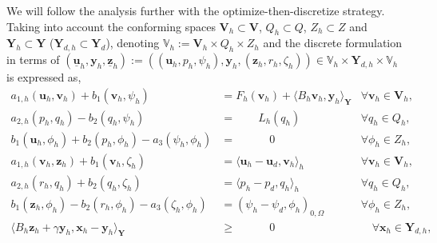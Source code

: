 \documentclass[smallextended]{svjour3}
\numberwithin{equation}{section}
\numberwithin{figure}{section}
\numberwithin{table}{section}
\newcommand\bV{\mathbf{V}}
\newcommand\buu{\underline{\boldsymbol{u}}}
\newcommand\buz{\underline{\boldsymbol{z}}}
\newcommand\bx{\boldsymbol{x}}
\newcommand\by{\boldsymbol{y}}
\newcommand\bu{\boldsymbol{u}}
\newcommand\bv{\boldsymbol{v}}
\newcommand\bz{\boldsymbol{z}}
\newcommand{\bYd}{\boldsymbol{Y}_d}
\newcommand{\bY}{\boldsymbol{Y}}
\newcommand{\bbV}{\mathbb{V}}
\begin{document}
%	
	We will follow the analysis further with the optimize-then-discretize strategy. Taking into account the conforming spaces $\bV_h \subset \bV$, $Q_h \subset Q$, $Z_h \subset Z$ and $\bY_h \subset \bY$ ($\bY_{d,h} \subset \bYd$), denoting $\bbV_h:= \bV_h \times Q_h \times Z_h$ and the discrete formulation in terms of $(\buu_h, \by_h, \buz_h):= ((\bu_h, p_h, \psi_h), \by_h, (\bz_h, r_h, \zeta_h)) \in \bbV_h \times \bY_{d,h} \times \bbV_h$ 
	 is expressed as,
	\begin{subequations} \label{eq:weak-h}
		\begin{align}
			a_{1,h}(\bu_h, \bv_h) + b_1(\bv_h, \psi_h) &= F_h(\bv_h) + \langle B_h \bv_h, \by_h \rangle_{\bY}  & \forall \bv_h \in \bV_h, \\
			a_{2,h}(p_h, q_h) - b_2(q_h, \psi_h) & =  \qquad L_h(q_h)  & \forall q_h \in Q_h, \\
			b_1(\bu_h, \phi_h) + b_2(p_h, \phi_h) - a_3(\psi_h, \phi_h) & = \qquad \quad 0  & \forall \phi_h \in Z_h, \\
			a_{1,h}(\bv_h, \bz_h) + b_1(\bv_h, \zeta_h) &= \langle \bu_h - \bu_d, \bv_h \rangle_h  & \forall \bv_h \in \bV_h, \\
			a_{2,h}(r_h, q_h) + b_2(q_h, \zeta_h) & = \langle p_h - p_d, q_h \rangle_h & \forall q_h \in Q_h, \\
			b_1(\bz_h, \phi_h) - b_2(r_h, \phi_h) - a_3(\zeta_h, \phi_h) & = ( \psi_h - \psi_d, \phi_h )_{0, \Omega}  & \forall \phi_h \in Z_h, \\
			\langle B_h \bz_h+ \gamma \by_h, \bx_h - \by_h \rangle_{\bY} & \ge  \qquad \quad 0 &\quad \forall \bx_h \in \bY_{d,h},  \label{eq:optimality-h}
		\end{align}
	\end{subequations}
\end{document}
